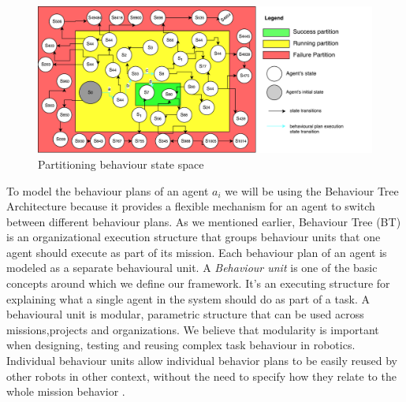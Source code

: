 \documentclass[journal]{IEEEtran}
\theoremstyle{definition}
\newcommand\patrizio[1]{\nb{Patrizio}{#1}}
\begin{document}
\begin{figure}[h]
\includegraphics[width=.5\textwidth]{Figures/BS3.pdf}
\caption{Partitioning behaviour state space}\label{fig:BS}
\end{figure}





To model the behaviour plans of an agent $a_i$ we will be using the Behaviour Tree Architecture because it provides a flexible mechanism for an agent to switch between different behaviour plans.
As we mentioned earlier, Behaviour Tree (BT) is an organizational execution structure that groups behaviour units that one agent should execute as part of its mission. 
Each behaviour plan of an agent is modeled as a separate behavioural unit.
 A \textit{Behaviour unit} is one of the basic concepts around which we define our framework. It's an executing structure for explaining what a single agent in the system should do as part of a task. A behavioural unit is modular, parametric structure that can be used across missions,projects and organizations.
We believe that modularity is important when designing, testing and reusing complex task behaviour in robotics. Individual behaviour units allow individual
behavior plans to be easily reused by other robots in other context, without the need to specify how they relate to the whole mission behavior \cite{colledanchise2017behavior}. %






 








\end{document}
